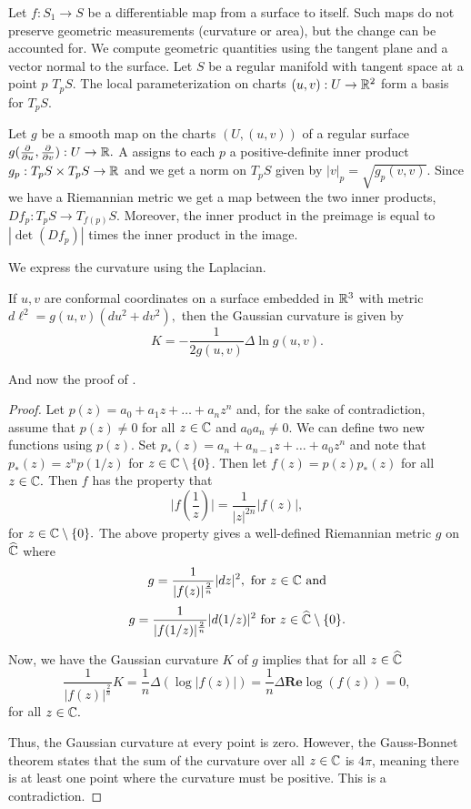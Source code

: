 Let $f:S_1\to S$ be a differentiable map from a surface to itself.
Such maps do not preserve geometric measurements (curvature or area), but the change
can be accounted for. We compute geometric quantities using the tangent plane and
a vector normal to the surface.
Let $S$ be a regular manifold with tangent space at a point $p$ $T_pS.$
The local parameterization on charts $(u,v):U\to \mathbb{R}^2$ form a basis for
$T_pS$.

Let $g$ be a smooth map on the charts $(U, (u,v))$ of a regular surface
$g(\frac{\partial}{\partial u},\frac{\partial}{\partial v}):U\to \mathbb{R}.$
A  assigns to each $p$ a positive-definite inner product
$g_p:T_pS\times T_pS \to \mathbb{R}$ and we get a norm on $T_pS$ given by
$|v|_p=\sqrt{g_p(v,v)}$.
Since we have a Riemannian metric we get a map between the two inner products,
$Df_p:T_pS\to T_{f(p)}S$. Moreover, the inner product in the preimage is equal
to $|\det(Df_p)|$ times the inner product in the image.


We express the curvature using the Laplacian.
\begin{lemma}\label{lem:lapa-curve}
	If $u,v$ are conformal coordinates on a surface
	embedded in $\mathbb{R}^3$ with metric $d\ell^2=g(u,v)(du^2+dv^2),$
	then the Gaussian curvature is given by
	$$K=-\frac{1}{2g(u,v)}\Delta \ln g(u,v).$$
\end{lemma}



And now the proof of .

\begin{proof}
 Let $p(z)=a_0+a_1z+\ldots + a_nz^n$ and, for the sake of contradiction,
 assume that $p(z)\neq 0$ for all $z\in \mathbb{C}$ and $a_0a_n\neq 0.$
 We can define two new functions using $p(z)$.
 Set $p_*(z)=a_n+a_{n-1}z+\ldots + a_0z^n$ and note that $p_*(z)=z^np(1/z)$ for $z\in \mathbb{C}\setminus\{0\}$.
 Then let $f(z)=p(z)p_*(z)$ for all $z\in \mathbb{C}.$
 Then $f$ has the property that
 $$\bigg | f\left(\frac{1}{z}\right) \bigg |=\frac{1}{|z|^{2n}}|f(z)|,$$ for $z\in \mathbb{C}\setminus\{0\}.$
 The above property gives a well-defined Riemannian metric $g$ on $\widehat{\mathbb{C}}$
 where 
 $$g=\frac{1}{|f(z)|^{\frac{2}{n}}}|dz|^2, \textrm{ for } z\in \mathbb{C} \textrm{ and}$$
 $$g=\frac{1}{|f(1/z)|^{\frac{2}{n}}}|d(1/z)|^2 \textrm{ for } z\in \widehat{\mathbb{C}}\setminus\{0\}.$$
 
 Now, we have the Gaussian curvature $K$ of $g$ implies that for all $z\in \widehat{\mathbb{C}}$
 $$\frac{1}{|f(z)|^{\frac{2}{n}}} K =\frac{1}{n}\Delta(\log |f(z)|)=\frac{1}{n}\Delta \textbf{Re} \log(f(z))=0,$$
 for all $z\in \mathbb{C}.$ 
 
Thus, the Gaussian curvature at every point is zero. However, the Gauss-Bonnet
 theorem states that the sum of the curvature over all $z\in \mathbb{C}$ is $4\pi$, meaning there is at least
 one point where the curvature must be positive. This is a contradiction.
\end{proof}


